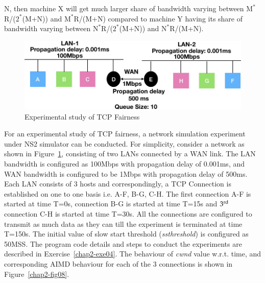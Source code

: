 \begin{multicols}{2}
N, then machine X will get much larger share of bandwidth varying between $\text{M}^{\ast}$R/($2^{\ast}$(M+N)) and $\text{M}^\ast$R/(M+N) compared to machine Y having its share of bandwidth varying between $\text{N}^{\ast}$R/($2^{\ast}$(M+N)) and $\text{N}^{\ast}$R/(M+N).

\begin{figure}[H]
\centering
\includegraphics[scale=1.15]{src/Figures/chap2/chap2-fig07.jpg}
\caption{Experimental study of TCP Fairness}\label{chap2-fig07}
\end{figure}

For an experimental study of TCP fairness, a network simulation experiment under NS2 simulator can be conducted. For simplicity, consider a network as shown in Figure~\ref{chap2-fig07}, consisting of two LANs connected by a WAN link. The LAN bandwidth is configured as 100Mbps with propagation delay of 0.001ms, and WAN bandwidth is configured to be 1Mbps with propagation delay of 500ms. Each LAN consists of 3 hosts and correspondingly, a TCP Connection is established on one to one basis i.e. A-F, B-G, C-H. The first connection A-F is started at time T=0s, connection B-G is started at time T=15s and ${\rm 3}^{\text{rd}}$ connection C-H is started at time T=30s. All the connections are configured to transmit as much data as they can  till the experiment is terminated at time T=150s. The initial value of slow start threshold (\textit{ssthreshold}) is configured as 50MSS. The program code details and steps to conduct the experiments are described in Exercise~\ref{chap2-exe04}. The behaviour of \textit{cwnd} value w.r.t. time, and corresponding AIMD behaviour for each of the 3 connections is shown in Figure~\ref{chap2-fig08}. 


\end{multicols}
